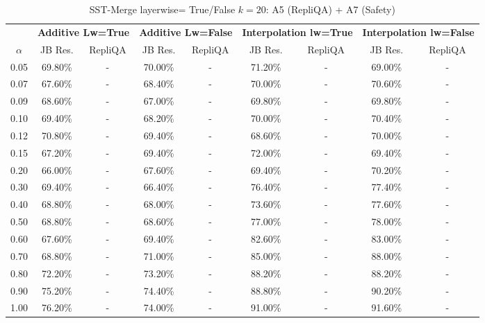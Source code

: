 \begin{table}[h]
\centering
\caption{SST-Merge layerwise= True/False $k=20$: A5 (RepliQA) + A7 (Safety)}
\label{tab:res_a5_a7_sst_20}
\begin{tabular}{c|cc|cc|cc|cc}
\hline
 & \multicolumn{2}{c|}{\textbf{Additive Lw=True}} & \multicolumn{2}{c|}{\textbf{Additive Lw=False}} & \multicolumn{2}{c|}{\textbf{Interpolation lw=True}}& \multicolumn{2}{c}{\textbf{Interpolation lw=False}} \\
$\alpha$ & JB Res. & RepliQA & JB Res. & RepliQA & JB Res. & RepliQA & JB Res. & RepliQA \\
\hline
0.05 & 69.80\% & - & 70.00\% & - & 71.20\% & - & 69.00\% & - \\
0.07 & 67.60\% & - & 68.40\% & - & 70.00\% & - & 70.60\% & - \\
0.09 & 68.60\% & - & 67.00\% & - & 69.80\% & - & 69.80\% & - \\
0.10 & 69.40\% & - & 68.20\% & - & 70.00\% & - & 70.40\% & - \\
0.12 & 70.80\% & - & 69.40\% & - & 68.60\% & - & 70.00\% & - \\
0.15 & 67.20\% & - & 69.40\% & - & 72.00\% & - & 69.40\% & - \\
0.20 & 66.00\% & - & 67.60\% & - & 69.40\% & - & 70.20\% & - \\
0.30 & 69.40\% & - & 66.40\% & - & 76.40\% & - & 77.40\% & - \\
0.40 & 68.80\% & - & 68.00\% & - & 73.60\% & - & 77.60\% & - \\
0.50 & 68.80\% & - & 68.60\% & - & 77.00\% & - & 78.00\% & - \\
0.60 & 67.60\% & - & 69.40\% & - & 82.60\% & - & 83.00\% & - \\
0.70 & 68.80\% & - & 71.00\% & - & 85.00\% & - & 88.00\% & - \\
0.80 & 72.20\% & - & 73.20\% & - & 88.20\% & - & 88.20\% & - \\
0.90 & 75.20\% & - & 74.40\% & - & 88.80\% & - & 90.20\% & - \\
1.00 & 76.20\% & - & 74.00\% & - & 91.00\% & - & 91.60\% & - \\
\hline
\end{tabular}
\end{table}
\FloatBarrier

